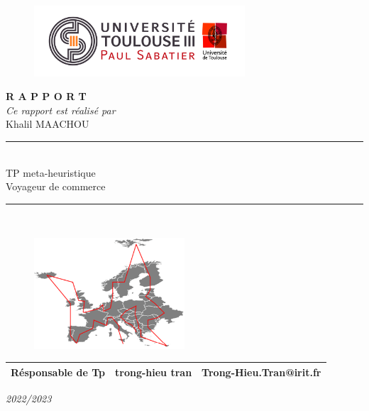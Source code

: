 \documentclass[12pt]{article}
\begin{document}
\thispagestyle{empty}
    \begin{center}
        \begin{figure}[h]
            \centering
            \includegraphics[width=0.7\textwidth]{Logo_UT3.jpg}
        \end{figure}
        \Huge \textbf{R A P P O R T} \normalsize\\\vfill
        \emph{Ce rapport est réalisé par}\\
        \Large Khalil MAACHOU\\
        \rule{0.8\textwidth}{2pt}\\
        \huge{}\selectfont TP meta-heuristique\\
        \LARGE Voyageur de commerce\\
        \rule{0.8\textwidth}{2pt}\\
        \begin{figure}[h]
            \centering
            \includegraphics[width=0.5\textwidth]{TSP.png}
        \end{figure}
    \end{center}
    \begin{center}
        \begin{tabular}{lll}
            \hline\hline
            \emph\Large {Résponsable de Tp} & \Large trong-hieu tran & \Large Trong-Hieu.Tran@irit.fr \\ 
            \hline\hline
        \end{tabular}
    \end{center}
    \begin{center}
        \emph{2022/2023}
    \end{center}
\end{document}

